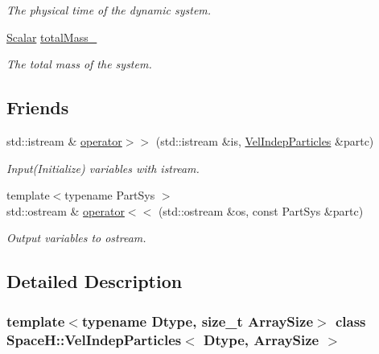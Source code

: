 \begin{DoxyCompactItemize}
\begin{DoxyCompactList}\small\item\em The physical time of the dynamic system. \end{DoxyCompactList}\item 
\mbox{\hyperlink{class_space_h_1_1_vel_indep_particles_aeb47d8131b30ed790320ff634f0d6af1}{Scalar}} \mbox{\hyperlink{class_space_h_1_1_vel_indep_particles_a5daf8df30b36ca633e0ef54933141524}{total\+Mass\+\_\+}}
\begin{DoxyCompactList}\small\item\em The total mass of the system. \end{DoxyCompactList}\end{DoxyCompactItemize}
\subsection*{Friends}
\begin{DoxyCompactItemize}
\item 
std\+::istream \& \mbox{\hyperlink{class_space_h_1_1_vel_indep_particles_a26d445a8934430c0634f60e387853724}{operator$>$$>$}} (std\+::istream \&is, \mbox{\hyperlink{class_space_h_1_1_vel_indep_particles}{Vel\+Indep\+Particles}} \&partc)
\begin{DoxyCompactList}\small\item\em Input(\+Initialize) variables with istream. \end{DoxyCompactList}\item 
{\footnotesize template$<$typename Part\+Sys $>$ }\\std\+::ostream \& \mbox{\hyperlink{class_space_h_1_1_vel_indep_particles_affef8e2a20305e8ee1e8f44e5c246e97}{operator$<$$<$}} (std\+::ostream \&os, const Part\+Sys \&partc)
\begin{DoxyCompactList}\small\item\em Output variables to ostream. \end{DoxyCompactList}\end{DoxyCompactItemize}


\subsection{Detailed Description}
\subsubsection*{template$<$typename Dtype, size\+\_\+t Array\+Size$>$\newline
class Space\+H\+::\+Vel\+Indep\+Particles$<$ Dtype, Array\+Size $>$}

